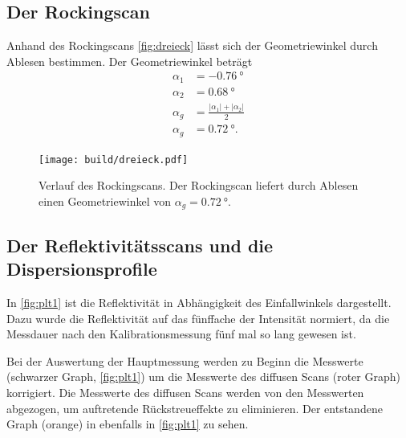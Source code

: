 \subsection*{Der Rockingscan}

Anhand des Rockingscans \autoref{fig:dreieck} lässt sich der Geometriewinkel durch Ablesen bestimmen.
Der Geometriewinkel beträgt
\begin{align*}
    \alpha_1 &= \SI{-0.76}{\degree}\\    
    \alpha_2 &= \SI{0.68}{\degree}\\    
    \alpha_g &= \frac{|\alpha_1|+|\alpha_2|}{2}\\
    \alpha_g &= \SI{0.72}{\degree}.    
\end{align*}
\begin{figure}
    \centering
    \texttt{[image: build/dreieck.pdf]}
    \caption{Verlauf des Rockingscans. Der Rockingscan liefert durch Ablesen einen Geometriewinkel von $\alpha_g = \SI{0.72}{\degree}$.}
    \label{fig:dreieck}
\end{figure}

\subsection{Der Reflektivitätsscans und die Dispersionsprofile}
In \autoref{fig:plt1} ist die Reflektivität in Abhängigkeit des Einfallwinkels dargestellt.
Dazu wurde die Reflektivität auf das fünffache der Intensität normiert, da die Messdauer nach den Kalibrationsmessung fünf mal so lang gewesen ist. 

Bei der Auswertung der Hauptmessung werden zu Beginn die Messwerte (schwarzer Graph, \autoref{fig:plt1}) um die Messwerte des
diffusen Scans (roter Graph) korrigiert. Die Messwerte des diffusen Scans werden von den Messwerten abgezogen, um auftretende Rückstreueffekte zu 
eliminieren. Der entstandene Graph (orange) in ebenfalls in \autoref{fig:plt1} zu sehen. 

